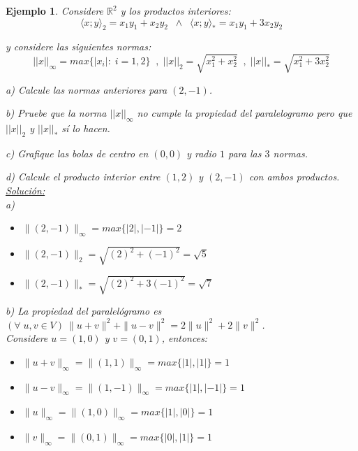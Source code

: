 \documentclass[12pt]{book}
\newtheorem{ejem}{Ejemplo}
\def\R{\mathbb{R}}
\begin{document}
{\vspace{0.3 cm}

\begin{ejem}{\em
Considere $\R^2$ y los productos interiores:
    $$\langle x;y\rangle_2=x_1y_1+x_2y_2\;\;\wedge\;\;\langle x;y\rangle_*=x_1y_1+3x_2y_2$$
    
    y considere las siguientes normas:
    $$||x||_{\infty}=max\{|x_i|:\;i=1,2\}\;\;,\;||x||_2=\sqrt{x_1^2+x_2^2}\;\;,\;||x||_*=\sqrt{x_1^2+3x_2^2}$$
   
    a) Calcule las normas anteriores para $(2,-1)$.
      
    b) Pruebe que la norma $||x||_{\infty}$ no cumple la propiedad del paralelogramo pero que $||x||_2$ y $||x||_*$ s\'i lo hacen.
        
    c) Grafique las bolas de centro en $(0,0)$ y radio $1$ para las $3$ normas.
    
    d) Calcule el producto interior entre $(1,2)$ y $(2,-1)$ con ambos productos.\\
    
    \underline{Soluci\'on:}\\
    
    a)
    \begin{itemize}
    \item $\| (2,-1)\|_{\infty}=max\{|2|,|-1|\}=2$
    \item $\| (2,-1)\|_{2}=\sqrt{(2)^2+(-1)^2}=\sqrt{5}$
    \item $\| (2,-1)\|_{*}=\sqrt{(2)^2+3(-1)^2}=\sqrt{7}$
    \end{itemize}
    
    \vspace{0.5 cm}
    
    b) La propiedad del paralel\'ogramo es $(\forall\;u,v\in V)\ \| u+v\|^2+\|u-v\|^2=2\|u\|^2+2\|v\|^2$.\\
    
    Considere $u=(1,0)$ y $v=(0,1)$, entonces: 
    \begin{itemize}
    \item $\| u+v\|_{\infty}=\| (1,1)\|_{\infty}=max\{|1|,|1|\}=1$
    \item $\| u-v\|_{\infty}=\| (1,-1)\|_{\infty}=max\{|1|,|-1|\}=1$
    \item $\| u\|_{\infty}=\| (1,0)\|_{\infty}=max\{|1|,|0|\}=1$
    \item $\| v\|_{\infty}=\| (0,1)\|_{\infty}=max\{|0|,|1|\}=1$
    \end{itemize}
    
}
\end{ejem}}
\end{document}
